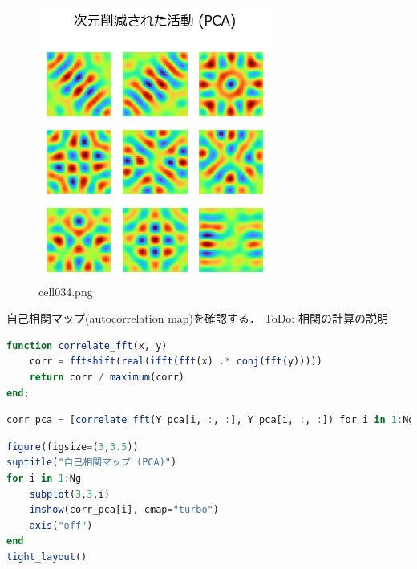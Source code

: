 \begin{figure}[ht]
	\centering
	\includegraphics[scale=0.8, max width=\linewidth]{./fig/local-learning-rule/pca-hebbian-learning/cell034.png}
	\caption{cell034.png}
	\label{cell034.png}
\end{figure}
自己相関マップ(autocorrelation map)を確認する．
ToDo: 相関の計算の説明
\begin{lstlisting}[language=julia]
function correlate_fft(x, y)
    corr = fftshift(real(ifft(fft(x) .* conj(fft(y)))))
    return corr / maximum(corr)
end;
\end{lstlisting}
\begin{lstlisting}[language=julia]
corr_pca = [correlate_fft(Y_pca[i, :, :], Y_pca[i, :, :]) for i in 1:Ng];
\end{lstlisting}
\begin{lstlisting}[language=julia]
figure(figsize=(3,3.5))
suptitle("自己相関マップ (PCA)")
for i in 1:Ng
    subplot(3,3,i)
    imshow(corr_pca[i], cmap="turbo")
    axis("off")
end
tight_layout()
\end{lstlisting}
